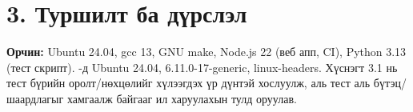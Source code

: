 \section*{3. Туршилт ба дүрслэл}

\textbf{Орчин:} Ubuntu 24.04, gcc 13, GNU make, Node.js 22 (веб апп, CI), Python 3.13 (тест скрипт). -д Ubuntu 24.04,  6.11.0-17-generic, linux-headers. Хүснэгт 3.1 нь тест бүрийн оролт/нөхцөлийг хүлээгдэх үр дүнтэй хослуулж, аль тест аль бүтэц/шаардлагыг хамгаалж байгааг ил харуулахын тулд оруулав.

